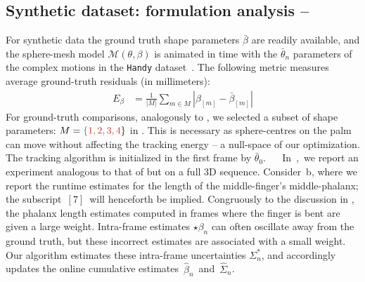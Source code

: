 \subsection{Synthetic dataset: formulation analysis -- }
\label{sec:analysis}
For synthetic data the ground truth shape parameters $\bar\beta$ are readily available, and the sphere-mesh model $\mathcal{M}(\theta,\beta)$ is animated in time with the $\bar\theta_n$ parameters of the complex motions in the \texttt{Handy} dataset~\cite{tkach2016sphere}. The following metric measures average ground-truth residuals (in millimeters):
% 
\begin{align}
E_{\beta} &= \tfrac{1}{|M|} \sum_{m \in M} \left| \beta_{[m]} - \bar\beta_{[m]} \right|
\label{eq:metricgt}
\end{align}
% 
For ground-truth comparisons, analogously to \cite{taylor2016joint}, we selected a subset of shape parameters: $M=\todo{\{1,2,3,4}\}$ in . This is necessary as sphere-centres on the palm can move without affecting the tracking energy -- a null-space of our optimization. The tracking algorithm is initialized in the first frame by $\bar\theta_0$.
%
$\quad$
% 
In~,~we report an experiment analogous to that of  but on a full 3D sequence.
Consider~b, where we report the runtime estimates for the length of the middle-finger's middle-phalanx; the subscript~{$[7]$}~will henceforth be implied.
Congruously to the discussion in , the phalanx length
estimates computed in frames where the finger is bent are given a large weight.
Intra-frame estimates {\small $\star\beta_n$} can often oscillate away from the ground truth, but these incorrect estimates are associated with a small weight.
% 
Our algorithm estimates these intra-frame uncertainties {\small $\Sigma^*_n$}, and accordingly updates the online cumulative estimates~{\small $\hat\beta_n$}~and~{\small $\hat\Sigma_n$}.


